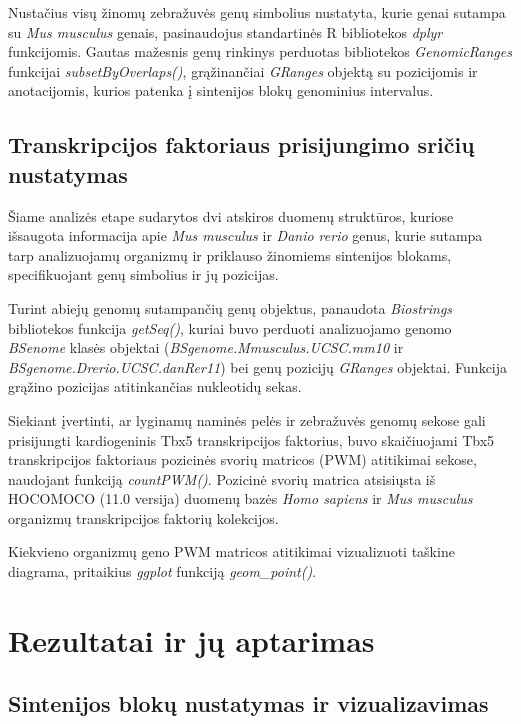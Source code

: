 \documentclass[12pt]{article}
\begin{document}
Nustačius visų žinomų zebražuvės genų simbolius nustatyta, kurie genai sutampa
su \emph{Mus musculus} genais, pasinaudojus standartinės R bibliotekos
\emph{dplyr}\cite{DPLYR} funkcijomis. Gautas mažesnis genų rinkinys perduotas
bibliotekos \emph{GenomicRanges}\cite{GRANGES} funkcijai
\emph{subsetByOverlaps()}, grąžinančiai \emph{GRanges} objektą su pozicijomis
ir anotacijomis, kurios patenka į sintenijos blokų genominius intervalus.

\subsection{Transkripcijos faktoriaus prisijungimo sričių nustatymas}
Šiame analizės etape sudarytos dvi atskiros duomenų struktūros, kuriose
išsaugota informacija apie \emph{Mus musculus} ir \emph{Danio rerio} genus,
kurie sutampa tarp analizuojamų organizmų ir priklauso žinomiems sintenijos
blokams, specifikuojant genų simbolius ir jų pozicijas.

Turint abiejų genomų sutampančių genų objektus, panaudota
\emph{Biostrings}\cite{BIOSTRINGS}
bibliotekos funkcija \emph{getSeq()}, kuriai buvo perduoti analizuojamo genomo
\emph{BSenome}\cite{BSGENOME} klasės objektai
(\emph{BSgenome.Mmusculus.UCSC.mm10} ir \emph{BSgenome.Drerio.UCSC.danRer11})
bei genų pozicijų \emph{GRanges} objektai. Funkcija grąžino pozicijas
atitinkančias nukleotidų sekas.

Siekiant įvertinti, ar lyginamų naminės pelės ir zebražuvės genomų sekose gali
prisijungti kardiogeninis Tbx5 transkripcijos faktorius, buvo skaičiuojami Tbx5
transkripcijos faktoriaus pozicinės svorių matricos (PWM) atitikimai sekose,
naudojant funkciją \emph{countPWM()}. Pozicinė svorių matrica atsisiųsta iš
HOCOMOCO\cite{HOCOMOCO} (11.0 versija) duomenų bazės \emph{Homo sapiens} ir
\emph{Mus musculus} organizmų transkripcijos faktorių kolekcijos.

Kiekvieno organizmų geno PWM matricos atitikimai vizualizuoti taškine diagrama,
pritaikius \emph{ggplot} funkciją \emph{geom\_point()}.

\newpage


\section{Rezultatai ir jų aptarimas}
\subsection{Sintenijos blokų nustatymas ir vizualizavimas}
\end{document}

